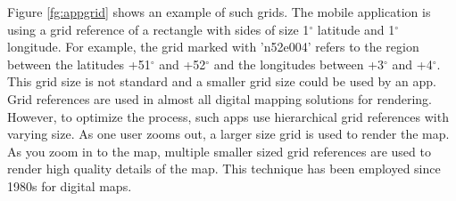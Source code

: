 Figure \ref{fg:appgrid} shows an example of such grids. The mobile application \cite{androidapp} is using a grid reference of a rectangle with sides of size 1$^{\circ}$ latitude and 1$^{\circ}$ longitude. For example, the grid marked with 'n52e004' refers to the region between the latitudes +51$^{\circ}$ and +52$^{\circ}$ and the longitudes between +3$^{\circ}$ and +4$^{\circ}$. This grid size is not standard and a smaller grid size could be used by an app. Grid references are used in almost all digital mapping solutions for rendering. However, to optimize the process, such apps use hierarchical grid references with varying size. As one user zooms out, a larger size grid is used to render the map. As you zoom in to the map, multiple smaller sized grid references are used to render high quality details of the map. This technique has been employed since 1980s for digital maps.
